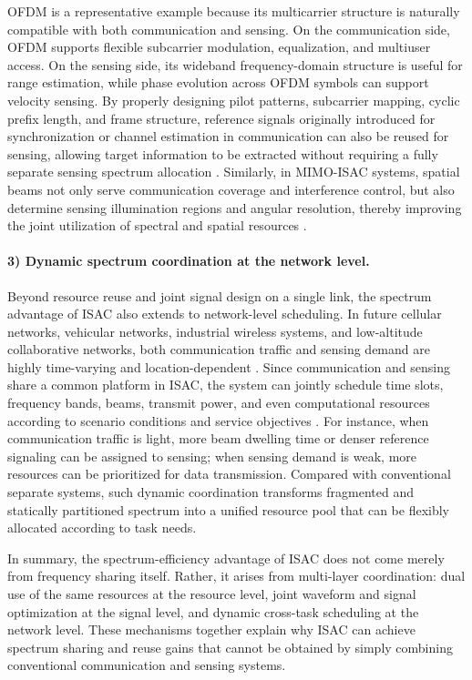 OFDM is a representative example because its multicarrier structure is naturally compatible with both communication and sensing. On the communication side, OFDM supports flexible subcarrier modulation, equalization, and multiuser access. On the sensing side, its wideband frequency-domain structure is useful for range estimation, while phase evolution across OFDM symbols can support velocity sensing. By properly designing pilot patterns, subcarrier mapping, cyclic prefix length, and frame structure, reference signals originally introduced for synchronization or channel estimation in communication can also be reused for sensing, allowing target information to be extracted without requiring a fully separate sensing spectrum allocation \cite{Ma2022WiFiSensingSurvey,Kumari2018IEEE80211adRadar}. Similarly, in MIMO-ISAC systems, spatial beams not only serve communication coverage and interference control, but also determine sensing illumination regions and angular resolution, thereby improving the joint utilization of spectral and spatial resources \cite{Liu2020JointRadarComm,Liu2022ISAC}.

\paragraph{3) Dynamic spectrum coordination at the network level.}
Beyond resource reuse and joint signal design on a single link, the spectrum advantage of ISAC also extends to network-level scheduling. In future cellular networks, vehicular networks, industrial wireless systems, and low-altitude collaborative networks, both communication traffic and sensing demand are highly time-varying and location-dependent \cite{Saad2020Vision6G,Cui2024integrated,IMT2030Framework}. Since communication and sensing share a common platform in ISAC, the system can jointly schedule time slots, frequency bands, beams, transmit power, and even computational resources according to scenario conditions and service objectives \cite{Zhang2020perceptive,Cui2024integrated}. For instance, when communication traffic is light, more beam dwelling time or denser reference signaling can be assigned to sensing; when sensing demand is weak, more resources can be prioritized for data transmission. Compared with conventional separate systems, such dynamic coordination transforms fragmented and statically partitioned spectrum into a unified resource pool that can be flexibly allocated according to task needs.

In summary, the spectrum-efficiency advantage of ISAC does not come merely from frequency sharing itself. Rather, it arises from multi-layer coordination: dual use of the same resources at the resource level, joint waveform and signal optimization at the signal level, and dynamic cross-task scheduling at the network level. These mechanisms together explain why ISAC can achieve spectrum sharing and reuse gains that cannot be obtained by simply combining conventional communication and sensing systems.


